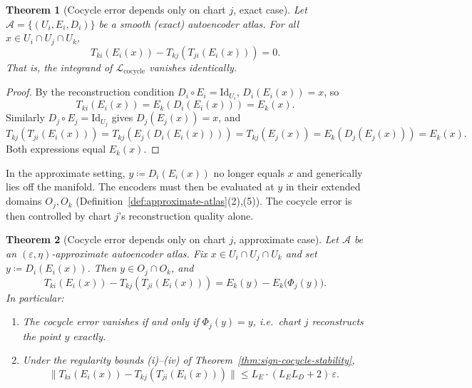 \documentclass[11pt]{article}
\theoremstyle{plain}
\newtheorem{theorem}{Theorem}[section]
\theoremstyle{definition}
\theoremstyle{remark}
\begin{document}
\begin{theorem}[Cocycle error depends only on chart $j$, exact case]\label{thm:cocycle-error-exact}
Let $\mathcal{A} = \{(U_i, E_i, D_i)\}$ be a smooth (exact) autoencoder atlas. For all $x \in U_i \cap U_j \cap U_k$,
\begin{equation}\label{eq:cocycle-error-exact}
T_{ki}(E_i(x)) - T_{kj}(T_{ji}(E_i(x))) = 0.
\end{equation}
That is, the integrand of $\mathcal{L}_{\mathrm{cocycle}}$ vanishes identically.
\end{theorem}

\begin{proof}
By the reconstruction condition $D_i \circ E_i = \mathrm{Id}_{U_i}$, $D_i(E_i(x)) = x$, so
\[
T_{ki}(E_i(x)) = E_k(D_i(E_i(x))) = E_k(x).
\]
Similarly $D_j \circ E_j = \mathrm{Id}_{U_j}$ gives $D_j(E_j(x)) = x$, and
\[
T_{kj}(T_{ji}(E_i(x))) = T_{kj}(E_j(D_i(E_i(x)))) = T_{kj}(E_j(x)) = E_k(D_j(E_j(x))) = E_k(x).
\]
Both expressions equal $E_k(x)$.
\end{proof}

In the approximate setting, $y \coloneqq D_i(E_i(x))$ no longer equals $x$ and generically lies off the manifold. The encoders must then be evaluated at $y$ in their extended domains $O_j, O_k$ (Definition~\ref{def:approximate-atlas}(2),(5)). The cocycle error is then controlled by chart $j$'s reconstruction quality alone.

\begin{theorem}[Cocycle error depends only on chart $j$, approximate case]\label{thm:cocycle-error-approx}
Let $\mathcal{A}$ be an $(\varepsilon, \eta)$-approximate autoencoder atlas. Fix $x \in U_i \cap U_j \cap U_k$ and set $y \coloneqq D_i(E_i(x))$. Then $y \in O_j \cap O_k$, and
\begin{equation}\label{eq:cocycle-error-approx}
T_{ki}(E_i(x)) - T_{kj}(T_{ji}(E_i(x))) = E_k(y) - E_k\bigl(\Phi_j(y)\bigr).
\end{equation}
In particular:
\begin{enumerate}
    \item The cocycle error vanishes if and only if $\Phi_j(y) = y$, i.e.\ chart $j$ reconstructs the point $y$ exactly.
    \item Under the regularity bounds (i)--(iv) of Theorem~\ref{thm:sign-cocycle-stability},
    \begin{equation}\label{eq:cocycle-error-bound}
    \bigl\|T_{ki}(E_i(x)) - T_{kj}(T_{ji}(E_i(x)))\bigr\| \leq L_E \cdot (L_E L_D + 2)\,\varepsilon.
    \end{equation}
\end{enumerate}
\end{theorem}
\end{document}
